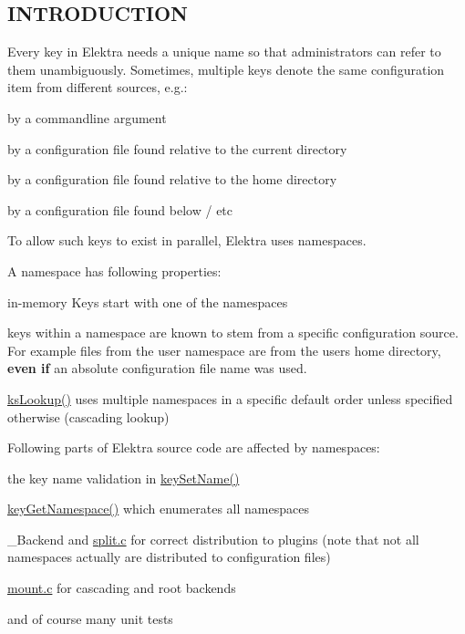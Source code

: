 \subsection*{I\+N\+T\+R\+O\+D\+U\+C\+T\+I\+ON}

Every key in Elektra needs a unique name so that administrators can refer to them unambiguously. Sometimes, multiple keys denote the same configuration item from different sources, e.\+g.\+:


\begin{DoxyItemize}
\item by a commandline argument
\item by a configuration file found relative to the current directory
\item by a configuration file found relative to the home directory
\item by a configuration file found below {\ttfamily /} etc
\end{DoxyItemize}

To allow such keys to exist in parallel, Elektra uses namespaces.

A namespace has following properties\+:


\begin{DoxyItemize}
\item in-\/memory Keys start with one of the namespaces
\item keys within a namespace are known to stem from a specific configuration source. For example files from the {\ttfamily user} namespace are from the users home directory, {\bfseries even if} an absolute configuration file name was used.
\item {\ttfamily \hyperlink{group__keyset_gaa34fc43a081e6b01e4120daa6c112004}{ks\+Lookup()}} uses multiple namespaces in a specific default order unless specified otherwise (cascading lookup)
\end{DoxyItemize}

Following parts of Elektra source code are affected by namespaces\+:


\begin{DoxyItemize}
\item the key name validation in {\ttfamily \hyperlink{group__keyname_ga7699091610e7f3f43d2949514a4b35d9}{key\+Set\+Name()}}
\item {\ttfamily \hyperlink{group__keyname_gafc3ca03ed10f87eb59bdc02cf2a0de8d}{key\+Get\+Namespace()}} which enumerates all namespaces
\item {\ttfamily \+\_\+\+Backend} and {\ttfamily \hyperlink{split_8c}{split.\+c}} for correct distribution to plugins (note that not all namespaces actually are distributed to configuration files)
\item {\ttfamily \hyperlink{mount_8c}{mount.\+c}} for cascading and root backends
\item and of course many unit tests
\end{DoxyItemize}

